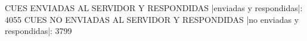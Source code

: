 CUES ENVIADAS AL SERVIDOR Y RESPONDIDAS
|enviadas y respondidas|: 4055
CUES NO ENVIADAS AL SERVIDOR Y RESPONDIDAS
|no enviadas y respondidas|: 3799